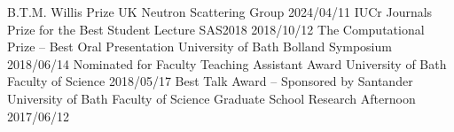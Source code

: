 \begin{cvpubs}
  \cvpub
    {B.T.M. Willis Prize}
    {UK Neutron Scattering Group}
    {2024/04/11}
  \cvpub
    {IUCr Journals Prize for the Best Student Lecture}
    {SAS2018}
    {2018/10/12}
  \cvpub
    {The Computational Prize -- Best Oral Presentation}
    {University of Bath Bolland Symposium}
    {2018/06/14}
  \cvpub
    {Nominated for Faculty Teaching Assistant Award}
    {University of Bath Faculty of Science}
    {2018/05/17}
  \cvpub
    {Best Talk Award -- Sponsored by Santander}
    {University of Bath Faculty of Science Graduate School Research Afternoon}
    {2017/06/12}
\end{cvpubs}